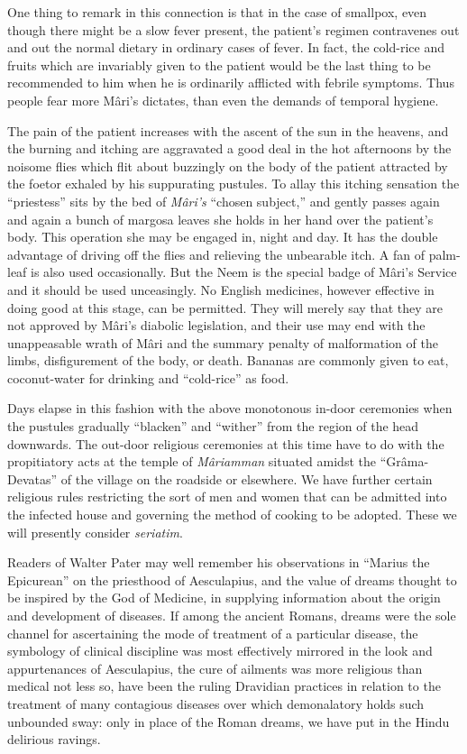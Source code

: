 \documentclass[a4paper, 12pt, oneside, english, twocolumn]{article}
\begin{document}
One thing to remark in this connection is that in the case of smallpox, even though there might be a slow fever present, the patient's regimen contravenes out and out the normal dietary in ordinary cases of fever. In fact, the cold-rice and fruits which are invariably given to the patient would be the last thing to be recommended to him when he is ordinarily afflicted with febrile symptoms. Thus people fear more Mâri's dictates, than even the demands of temporal hygiene.

The pain of the patient increases with the ascent of the sun in the heavens, and the burning and itching are aggravated a good deal in the hot afternoons by the noisome flies which flit about buzzingly on the body of the patient attracted by the foetor exhaled by his suppurating pustules. To allay this itching sensation the ``priestess'' sits by the bed of \emph{Mâri's} ``chosen subject,'' and gently passes again and again a bunch of margosa leaves she holds in her hand over the patient's body. This operation she may be engaged in, night and day. It has the double advantage of driving off the flies and relieving the unbearable itch. A fan of palm-leaf is also used occasionally. But the Neem is the special badge of Mâri's Service and it should be used unceasingly. No English medicines, however effective in doing good at this stage, can be permitted. They will merely say that they are not approved by Mâri's diabolic legislation, and their use may end with the unappeasable wrath of Mâri and the summary penalty of malformation of the limbs, disfigurement of the body, or death. Bananas are commonly given to eat, coconut-water for drinking and ``cold-rice'' as food.

Days elapse in this fashion with the above monotonous in-door ceremonies when the pustules gradually ``blacken'' and ``wither'' from the region of the head downwards. The out-door religious ceremonies at this time have to do with the propitiatory acts at the temple of \emph{Mâriamman} situated amidst the ``Grâma-Devatas'' of the village on the roadside or elsewhere. We have further certain religious rules restricting the sort of men and women that can be admitted into the infected house and governing the method of cooking to be adopted. These we will presently consider \emph{seriatim}.

Readers of Walter Pater may well remember his observations in ``Marius the Epicurean'' on the priesthood of Aesculapius, and the value of dreams thought to be inspired by the God of Medicine, in supplying information about the origin and development of diseases. If among the ancient Romans, dreams were the sole channel for ascertaining the mode of treatment of a particular disease, the symbology of clinical discipline was most effectively mirrored in the look and appurtenances of Aesculapius, the cure of ailments was more religious than medical not less so, have been the ruling Dravidian practices in relation to the treatment of many contagious diseases over which demonalatory holds such unbounded sway: only in place of the Roman dreams, we have put in the Hindu delirious ravings.
\end{document}
